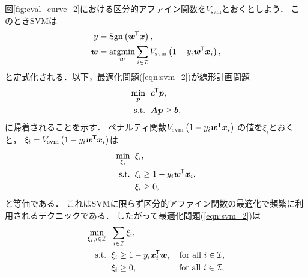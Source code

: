 図\ref{fig:eval_curve_2}における区分的アファイン関数を$V_{\mathrm{svm}}$とおくとしよう．
このときSVMは
\begin{align}
    \label{eqn:svm_1}
    y &= \operatorname*{Sgn} \left( \boldsymbol{w}^{\mkern-1.5mu\mathsf{T}}\boldsymbol{x} \right), \\
    \label{eqn:svm_2}
    \boldsymbol{w} &= \operatorname*{argmin}_{\boldsymbol{w}} \sum_{i \in \mathcal{I}} V_{\mathrm{svm}}
    \left( 1 - y_i \boldsymbol{w}^{\mkern-1.5mu\mathsf{T}}\boldsymbol{x}_i \right),
\end{align}
と定式化される．以下，最適化問題(\ref{eqn:svm_2})が線形計画問題
\begin{equation}\begin{split}
    \label{eqn:lp}
    \min_{\boldsymbol{p}} \hspace{6pt}& \boldsymbol{c}^{\mkern-1.5mu\mathsf{T}}\boldsymbol{p}, \\
    \text{s.t.}   \hspace{6pt}& \boldsymbol{A}\boldsymbol{p} \geq \boldsymbol{b},
\end{split}\end{equation}
に帰着されることを示す．
ペナルティ関数$V_{\mathrm{svm}} \left( 1 - y_i \boldsymbol{w}^{\mkern-1.5mu\mathsf{T}}\boldsymbol{x}_i \right)$
の値を$\xi_i$とおくと，
$\xi_i = V_{\mathrm{svm}} \left( 1 - y_i \boldsymbol{w}^{\mkern-1.5mu\mathsf{T}}\boldsymbol{x}_i \right)$は
\begin{equation}\begin{split}
    \min_{\xi_i} \hspace{6pt}& \xi_i,                                  \\
    \text{s.t.}  \hspace{6pt}& \xi_i \geq 1 - y_i \boldsymbol{w}^{\mkern-1.5mu\mathsf{T}}\boldsymbol{x}_i, \\
                             & \xi_i \geq 0,
\end{split}\end{equation}
と等価である．
これはSVMに限らず区分的アファイン関数の最適化で頻繁に利用されるテクニックである．    
したがって最適化問題(\ref{eqn:svm_2})は
\begin{equation}\begin{split}
    \min_{\xi_i, i \in \mathcal{I}} \hspace{6pt}& \sum_{i \in \mathcal{I}} \xi_i, \\
    \text{s.t.} \hspace{6pt}
    & \xi_i \geq 1 - y_i \boldsymbol{x}_i^{\mkern-1.5mu\mathsf{T}}\boldsymbol{w}, \hspace{10pt} \text{for all $i \in \mathcal{I}$}, \\
    & \xi_i \geq 0,                           \hspace{50pt} \text{for all $i \in \mathcal{I}$},
\end{split}\end{equation}

